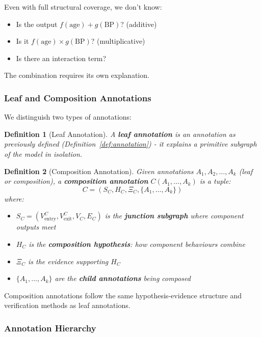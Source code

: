 \documentclass{article}
\newtheorem{definition}{Definition}
\begin{document}
Even with full structural coverage, we don't know:
\begin{itemize}
    \item Is the output $f(\text{age}) + g(\text{BP})$? (additive)
    \item Is it $f(\text{age}) \times g(\text{BP})$? (multiplicative)
    \item Is there an interaction term?
\end{itemize}

The combination requires its own explanation.

\subsubsection{Leaf and Composition Annotations}

We distinguish two types of annotations:

\begin{definition}[Leaf Annotation]
A \textbf{leaf annotation} is an annotation as previously defined (Definition~\ref{def:annotation}) - it explains a primitive subgraph of the model in isolation.
\end{definition}


\begin{definition}[Composition Annotation]
Given annotations $A_1, A_2, \ldots, A_k$ (leaf or composition), a \textbf{composition annotation} $C(A_1, \ldots, A_k)$ is a tuple:
\[
C = (S_C, H_C, \Xi_C, \{A_1, \ldots, A_k\})
\]
where:
\begin{itemize}
    \item $S_C = (V_{\text{entry}}^C, V_{\text{exit}}^C, V_C, E_C)$ is the \textbf{junction subgraph} where component outputs meet
    \item $H_C$ is the \textbf{composition hypothesis}: how component behaviours combine
    \item $\Xi_C$ is the evidence supporting $H_C$
    \item $\{A_1, \ldots, A_k\}$ are the \textbf{child annotations} being composed
\end{itemize}
\end{definition}


Composition annotations follow the same hypothesis-evidence structure and verification methods as leaf annotations.

\subsubsection{Annotation Hierarchy}
\end{document}
